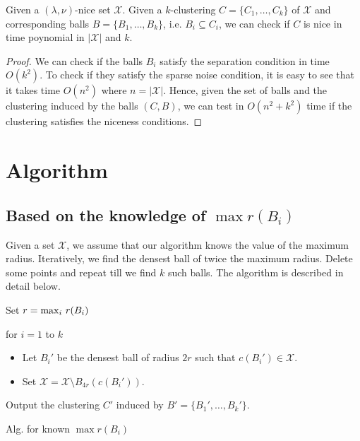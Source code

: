 \documentclass[11pt]{article}
\newenvironment{alg}{
    \begin{list}{}{
        \setlength{\itemsep}{2pt}
        \setlength{\parsep}{0pt}
        \setlength{\parskip}{0pt}
        \setlength{\topsep}{1pt}
    }
}
{
    \end{list}
}
\begin{document}
\begin{lemma}
\label{lemma:chknice}
Given a $(\lambda,\nu)$-nice set $\mathcal{X}$. Given a $k$-clustering $C = \{C_1,\ldots,C_k\}$ of $\mathcal{X}$ and corresponding balls $B = \{B_1,\ldots,B_k\}$, i.e. $B_i \subseteq C_i$, we can check if $C$ is nice in time poynomial in $|\mathcal{X}|$ and $k$.
\end{lemma}
\begin{proof}
We can check if the balls $B_i$ satisfy the separation condition in time $O(k^2)$. To check if they satisfy the sparse noise condition, it is easy to see that it takes time $O(n^2)$ where $n = |\mathcal{X}|$. Hence, given the set of balls and the clustering induced by the balls $(C,B)$, we can test in $O(n^2+k^2)$ time if the clustering satisfies the niceness conditions.
\end{proof}

\section{Algorithm}
\subsection{Based on the knowledge of $\max r(B_i)$}
Given a set $\mathcal{X}$, we assume that our algorithm knows the value of the maximum radius. Iteratively, we find the densest ball of twice the maximum radius. Delete some points and repeat till we find $k$ such balls. The algorithm is described in detail below.

\begin{algorithm}
\begin{alg}
	\item[] Set $r = \max_i \thinspace r(B_i)$
	\item[] for $i=1$ to $k$
	\begin{itemize}
		\item[] Let $B_i'$ be the densest ball of radius $2r$ such that $c(B_i') \in \mathcal{X}$.
		\item[] Set $\mathcal{X}=\mathcal{X}\setminus B_{4r}(c(B_i'))$. 
	\end{itemize}
Output the clustering $C'$ induced by $B' = \{B_1',\ldots,B_k'\}$.
\label{alg:NotKnown}
\end{alg}
\caption{Alg. for known $\max{r(B_i)}$}
\end{algorithm}
\end{document}

